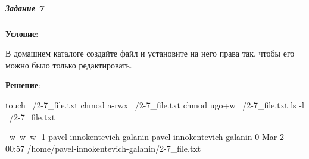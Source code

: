 \subparagraph{Задание 7} \textbf{Условие}:

В домашнем каталоге создайте файл и установите на него права так, чтобы его можно было только редактировать.

\textbf{Решение}:

\begin{BashBox}
    touch ~/2-7_file.txt
    chmod a-rwx ~/2-7_file.txt
    chmod ugo+w ~/2-7_file.txt
    ls -l ~/2-7_file.txt
\end{BashBox}

\begin{OutBox}
    --w--w--w- 1 pavel-innokentevich-galanin pavel-innokentevich-galanin 0 Mar  2 00:57 /home/pavel-innokentevich-galanin/2-7_file.txt
\end{OutBox}
